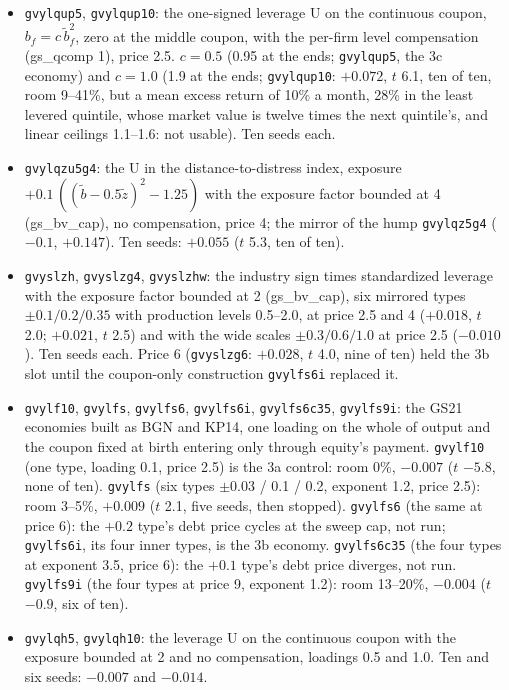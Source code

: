 \begin{itemize}
\item \texttt{gvylqup5}, \texttt{gvylqup10}: the one-signed leverage U on the continuous coupon, $b_f = c\,\tilde b_f^2$, zero at the middle coupon, with the per-firm level compensation (gs\_qcomp 1), price 2.5. $c = 0.5$ (0.95 at the ends; \texttt{gvylqup5}, the 3c economy) and $c = 1.0$ (1.9 at the ends; \texttt{gvylqup10}: $+0.072$, $t$ 6.1, ten of ten, room 9--41\%, but a mean excess return of 10\% a month, 28\% in the least levered quintile, whose market value is twelve times the next quintile's, and linear ceilings 1.1--1.6: not usable). Ten seeds each.
\item \texttt{gvylqzu5g4}: the U in the distance-to-distress index, exposure $+0.1\,((\tilde b - 0.5\tilde z)^2 - 1.25)$ with the exposure factor bounded at 4 (gs\_bv\_cap), no compensation, price 4; the mirror of the hump \texttt{gvylqz5g4} ($-0.1$, $+0.147$). Ten seeds: $+0.055$ ($t$ 5.3, ten of ten).
\item \texttt{gvyslzh}, \texttt{gvyslzg4}, \texttt{gvyslzhw}: the industry sign times standardized leverage with the exposure factor bounded at 2 (gs\_bv\_cap), six mirrored types $\pm0.1/0.2/0.35$ with production levels 0.5--2.0, at price 2.5 and 4 ($+0.018$, $t$ 2.0; $+0.021$, $t$ 2.5) and with the wide scales $\pm0.3/0.6/1.0$ at price 2.5 ($-0.010$). Ten seeds each. Price 6 (\texttt{gvyslzg6}: $+0.028$, $t$ 4.0, nine of ten) held the 3b slot until the coupon-only construction \texttt{gvylfs6i} replaced it.
\item \texttt{gvylf10}, \texttt{gvylfs}, \texttt{gvylfs6}, \texttt{gvylfs6i}, \texttt{gvylfs6c35}, \texttt{gvylfs9i}: the GS21 economies built as BGN and KP14, one loading on the whole of output and the coupon fixed at birth entering only through equity's payment. \texttt{gvylf10} (one type, loading 0.1, price 2.5) is the 3a control: room 0\%, $-0.007$ ($t$ $-5.8$, none of ten). \texttt{gvylfs} (six types $\pm 0.03$ / 0.1 / 0.2, exponent 1.2, price 2.5): room 3--5\%, $+0.009$ ($t$ 2.1, five seeds, then stopped). \texttt{gvylfs6} (the same at price 6): the $+0.2$ type's debt price cycles at the sweep cap, not run; \texttt{gvylfs6i}, its four inner types, is the 3b economy. \texttt{gvylfs6c35} (the four types at exponent 3.5, price 6): the $+0.1$ type's debt price diverges, not run. \texttt{gvylfs9i} (the four types at price 9, exponent 1.2): room 13--20\%, $-0.004$ ($t$ $-0.9$, six of ten).
\item \texttt{gvylqh5}, \texttt{gvylqh10}: the leverage U on the continuous coupon with the exposure bounded at 2 and no compensation, loadings 0.5 and 1.0. Ten and six seeds: $-0.007$ and $-0.014$.

\end{itemize}
